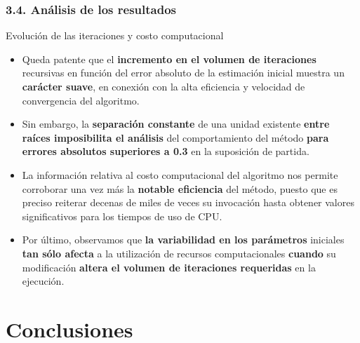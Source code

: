 \documentclass{beamer}
\begin{document}
\begin{frame}
\frametitle{3.4. Análisis de los resultados}
\begin{block}{Evolución de las iteraciones y costo computacional}

\begin{itemize}
    \item
      Queda patente que el \textbf{incremento en el volumen de iteraciones} recursivas en 
      función del error absoluto de la estimación inicial muestra un \textbf{carácter suave}, 
      en conexión con la alta eficiencia y velocidad de convergencia del algoritmo.
      \pause
      \vspace*{-0.1cm}
    \item
      Sin embargo, la \textbf{separación constante} de una unidad existente \textbf{entre raíces 
      imposibilita el análisis} del comportamiento del método \textbf{para errores absolutos 
      superiores a 0.3} en la suposición de partida.
      \pause
      \vspace*{-0.1cm}
    \item
      La información relativa al costo computacional del algoritmo nos permite corroborar una vez 
      más la \textbf{notable eficiencia} del método, puesto que es preciso reiterar decenas de miles 
      de veces su invocación hasta obtener valores significativos para los tiempos de uso de CPU.
      \pause
      \vspace*{-0.1cm}
    \item
      Por último, observamos que \textbf{la variabilidad en los parámetros} iniciales \textbf{tan
      sólo afecta} a la utilización de recursos computacionales \textbf{cuando} su modificación 
      \textbf{altera el volumen de iteraciones requeridas} en la ejecución.
       
\end{itemize}

\end{block}
\end{frame}


\section{Conclusiones}

\end{document}

